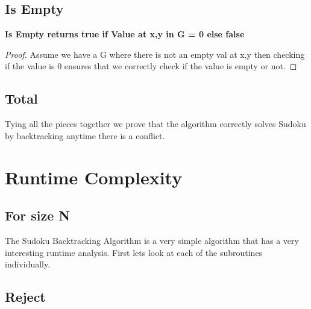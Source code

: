 \documentclass{sig-alternate}
\begin{document}
\subsection{Is Empty}
\textbf{Is Empty returns true if Value at x,y in G = 0 else false}
\begin{proof}
Assume we have a G where there is not an empty val at x,y then checking if the value is 0 ensures that we correctly check if the value is empty or not. 
\end{proof}

\subsection{Total}
Tying all the pieces together we prove that the algorithm correctly solves Sudoku by backtracking anytime there is a conflict. 

\section{Runtime Complexity}

\subsection{For size N }
The Sudoku Backtracking Algorithm is a very simple algorithm that has a very interesting runtime analysis. First lets look at each of the subroutines individually. 

\subsection{Reject}
\end{document}
